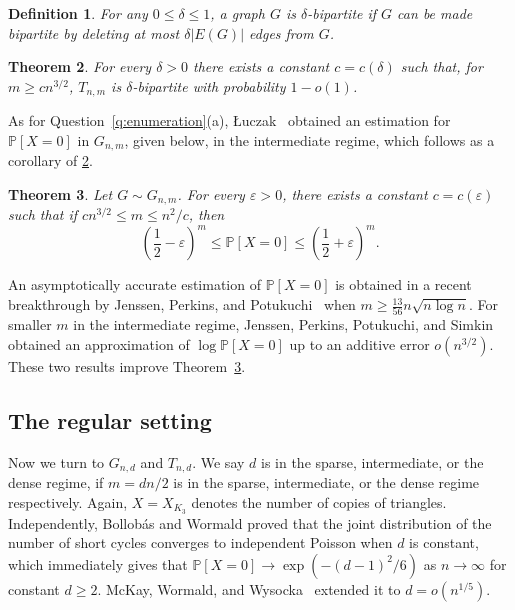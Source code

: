 \documentclass[11pt]{article}
\newcommand{\eps}{\varepsilon}
\def\P{\mathbb P}
\theoremstyle{plain}
\newtheorem{thm}{Theorem}[section]
\newtheorem{definition}[thm]{Definition}
\begin{document}
\begin{definition}
    For any $0 \leq \delta \leq 1$, a graph $G$ is $\delta$-bipartite if $G$ can be made bipartite by deleting at most $\delta|E(G)|$ edges from $G$.
\end{definition}

\begin{thm}\label{thm: luc 13}\cite{luczak2000triangle}
    For every $\delta > 0$ there exists a constant $c = c(\delta)$ such that, for $m \geq cn^{3/2}$,
    $T_{n,m}$ is $\delta$-bipartite with probability $1 - o(1)$.
\end{thm}
As for Question~\ref{q:enumeration}(a), {\L}uczak~\cite{luczak2000triangle} obtained an estimation for $\P[X = 0]$ in $G_{n,m}$, given below,  in the intermediate regime, which follows as a corollary of \cref{thm: luc 13}.

\begin{thm}\label{thm: luczak estimate}\cite{luczak2000triangle}
    Let $G \sim G_{n,m}$. For every $\eps > 0$, there exists a constant $c = c(\eps)$ such that if $cn^{3/2} \leq m \leq n^2/c$, then 
    \[
    \left(\frac{1}{2} - \eps\right)^m \leq \P[X = 0] \leq \left(\frac{1}{2} + \eps\right)^{m}.
    \]
\end{thm}
An asymptotically accurate estimation of $\P[X = 0]$ is obtained in a recent breakthrough by Jenssen, Perkins, and Potukuchi~\cite{JENSSEN2025110499} when $m \geq \frac{13}{56}n\sqrt{n\log n}$. For smaller $m$ in the intermediate regime,
Jenssen, Perkins, Potukuchi, and Simkin~\cite{jenssen2024lower}
obtained an approximation of $\log \P[X=0]$ up to an additive error $o(n^{3/2})$. These two results improve Theorem~\ref{thm: luczak estimate}.






\subsection{The regular setting}\label{sec: regular}
Now we turn to $G_{n,d}$ and $T_{n,d}$. 
We say $d$ is in the sparse, intermediate, or the dense regime, if $m=dn/2$ is in the sparse, intermediate, or the dense regime respectively.
Again, $X=X_{K_3}$ denotes the number of copies of triangles.  Independently, Bollob\'as \cite{Bollobas1980} and Wormald \cite{Wormald1978,Wormald1981} proved that the joint distribution of the number of short cycles converges to independent Poisson when $d$ is constant, which immediately gives that $\P[X=0]\to \exp(-(d-1)^2/6)$ as $n\to \infty$ for constant $d\ge 2$. McKay, Wormald, and Wysocka~\cite{McKayWormaldWysocka2004} extended it to  $d=o(n^{1/5})$.  
\end{document}
